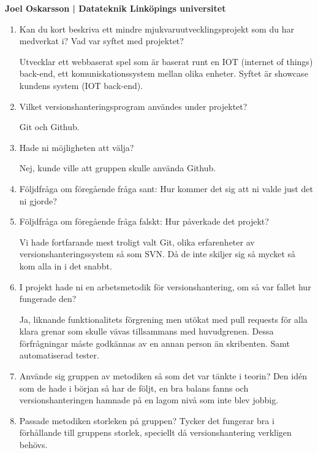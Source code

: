 \clearpage
\begin{center}
    \textbf{Joel Oskarsson | Datateknik Linköpings universitet}
\end{center}
\begin{enumerate}

  \item Kan du kort beskriva ett mindre mjukvaruutvecklingsprojekt som du har medverkat i? Vad var syftet med projektet?

  Utvecklar ett webbaserat spel som är baserat runt en IOT (internet of things) back-end, ett komuniskationssystem mellan olika enheter. Syftet är showcase kundens system (IOT back-end).

  \item Vilket versionshanteringsprogram användes under projektet?

  Git och Github.

  \item Hade ni möjligheten att välja?

  Nej, kunde ville att gruppen skulle använda Github.

  \item Följdfråga om föregående fråga sant: Hur kommer det sig att ni valde just det ni gjorde?
  \item Följdfråga om föregående fråga falskt: Hur påverkade det projekt?

  Vi hade fortfarande mest troligt valt Git, olika erfarenheter av versionshanteringssystem så som SVN. Då de inte skiljer sig så mycket så kom alla in i det snabbt.

  \item I projekt hade ni en arbetsmetodik för versionshantering, om så var fallet hur fungerade den?

  Ja, liknande funktionalitets förgrening men utökat med pull requests för alla klara grenar som skulle vävas tillsammans med huvudgrenen. Dessa förfrågningar måste godkännas av en annan person än skribenten. Samt automatiserad tester.

  \item Använde sig gruppen av metodiken så som det var tänkte i teorin?
  Den idén som de hade i början så har de följt, en bra balans fanns och versionshanteringen hamnade på en lagom nivå som inte blev jobbig.

  \item Passade metodiken storleken på gruppen?
  Tycker det fungerar bra  i förhållande till gruppens storlek, speciellt då versionshantering verkligen behövs.


\end{enumerate}
